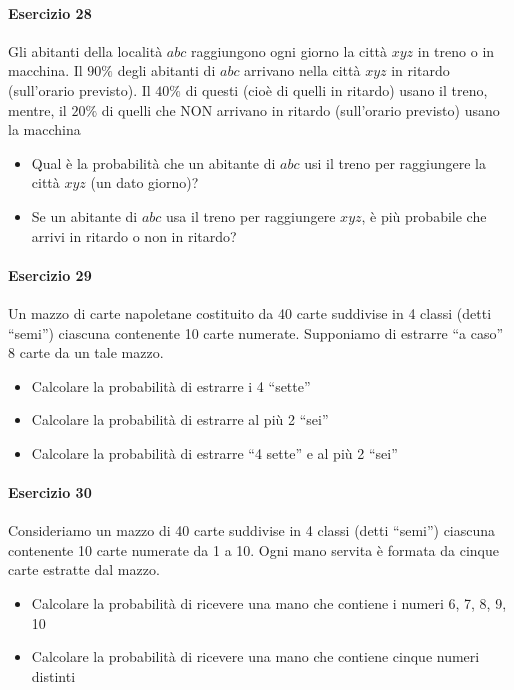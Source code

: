 \documentclass[12pt]{article}
\begin{document}
    \paragraph{Esercizio 28}
    Gli abitanti della località $abc$ raggiungono ogni giorno la città $xyz$ in treno o in macchina. Il $90\%$ degli abitanti di $abc$ arrivano nella città $xyz$ in ritardo (sull’orario previsto). Il $40\%$ di questi (cioè di quelli in ritardo) usano il treno, mentre, il $20\%$ di quelli che NON arrivano in ritardo (sull’orario previsto) usano la macchina
    \begin{itemize}
        \item Qual è la probabilità che un abitante di $abc$ usi il treno per raggiungere la città $xyz$ (un dato giorno)?
        \item Se un abitante di $abc$ usa il treno per raggiungere $xyz$, è più probabile che arrivi in ritardo o non in ritardo?
    \end{itemize}
    \paragraph{Esercizio 29}
    Un mazzo di carte napoletane costituito da 40 carte suddivise in 4 classi (detti “semi”) ciascuna contenente 10 carte numerate. Supponiamo di estrarre “a caso” 8 carte da un tale mazzo.
    \begin{itemize}
        \item Calcolare la probabilità di estrarre i 4 “sette”
        \item Calcolare la probabilità di estrarre al più 2 “sei”
        \item Calcolare la probabilità di estrarre “4 sette” e al più 2 “sei”
    \end{itemize}
    \paragraph{Esercizio 30}
    Consideriamo un mazzo di 40 carte suddivise in 4 classi (detti “semi”) ciascuna contenente 10 carte numerate da 1 a 10. Ogni mano servita è formata da cinque carte estratte dal mazzo.
    \begin{itemize}
        \item Calcolare la probabilità di ricevere una mano che contiene i numeri 6, 7, 8, 9, 10
        \item Calcolare la probabilità di ricevere una mano che contiene cinque numeri distinti
    \end{itemize}
    \newpage
\end{document}
